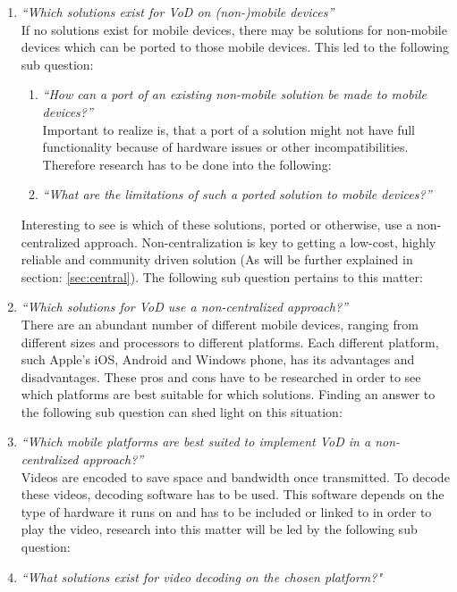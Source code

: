 \begin{enumerate}
	\item\textit{``Which solutions exist for VoD on (non-)mobile devices''}\\
	
	If no solutions exist for mobile devices, there may be solutions for non-mobile devices which can be ported to those mobile devices. This led to the following sub question:\\

		\begin{enumerate}
			\item\textit{``How can a port of an existing non-mobile solution be made to mobile devices?''}\\
			
			Important to realize is, that a port of a solution might not have full functionality because of hardware issues or other incompatibilities. Therefore research has to be done into the following:\\
			
			\item\textit{``What are the limitations of such a ported solution to mobile devices?''}\\
		\end{enumerate}

	Interesting to see is which of these solutions, ported or otherwise, use a non-centralized approach. Non-centralization is key to getting a low-cost, highly reliable and community driven solution (As will be further explained in section: \ref{sec:central}). The following sub question pertains to this matter: \\

	\item\textit{``Which solutions for VoD use a non-centralized approach?''}\\

	There are an abundant number of different mobile devices, ranging from different sizes and processors to different platforms. Each different platform, such Apple's iOS, Android and Windows phone, has its advantages and disadvantages. These pros and cons have to be researched in order to see which platforms are best suitable for which solutions. Finding an answer to the following sub question can shed light on this situation:\\

	\item\textit{``Which mobile platforms are best suited to implement VoD in a non-centralized approach?''}\\
	
	Videos are encoded to save space and bandwidth once transmitted. To decode these videos, decoding software has to be used. This software depends on the type of hardware it runs on and has to be included or linked to in order to play the video, research into this matter will be led by the following sub question:\\

	\item\textit{``What solutions exist for video decoding on the chosen platform?"}\\
\end{enumerate}

